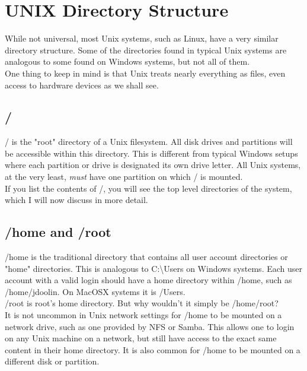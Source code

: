 \chapter{UNIX Directory Structure}

While not universal, most Unix systems, such as Linux, have a very similar directory structure.  Some of the directories found in typical Unix systems are analogous to some found on Windows systems, but not all of them.\\

One thing to keep in mind is that Unix treats nearly everything as files, even access to hardware devices as we shall see.

\section{/}

/ is the "root" directory of a Unix filesystem.  All disk drives and partitions will be accessible within this directory.  This is different from typical Windows setups where each partition or drive is designated its own drive letter.  All Unix systems, at the very least, \textit{must} have one partition on which / is mounted.\\

If you list the contents of /, you will see the top level directories of the system, which I will now discuss in more detail.

\section{/home and /root}

/home is the traditional directory that contains all user account directories or "home" directories.  This is analogous to C:\textbackslash Users on Windows systems.  Each user account with a valid login should have a home directory within /home, such as /home/jdoolin.  On MacOSX systems it is /Users.\\

/root is root's home directory.  But why wouldn't it simply be /home/root?\\

It is not uncommon in Unix network settings for /home to be mounted on a network drive, such as one provided by NFS or Samba.  This allows one to login on any Unix machine on a network, but still have access to the exact same content in their home directory.  It is also common for /home to be mounted on a different disk or partition.\\

